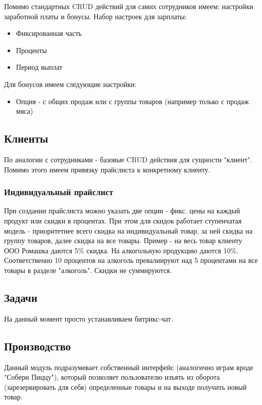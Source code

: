 \documentclass[DIV=calc, paper=a4, fontsize=11pt]{scrartcl} %
\begin{document}
Помимо стандартных CRUD действий для самих сотрудников имеем: настройки заработной платы и бонусы. Набор настроек для зарплаты:

\begin{itemize}
	\item Фиксированная часть
	\item Проценты
	\item Период выплат
\end{itemize}

Для бонусов имеем следующие настройки:

\begin{itemize}
	\item Опция - с общих продаж или с группы товаров (например только с продаж мяса)
\end{itemize}

\subsection{Клиенты}

По аналогии с сотрудниками - базовые CRUD действия для сущности "клиент". Помимо этого имеем привязку прайслиста к конкретному клиенту.

\subsubsection{Индивидуальный прайслист}
При создании прайслиста можно указать две опции - фикс. цены на каждый продукт или скидки в процентах. При этом для скидок работает ступенчатая модель - приоритетнее всего скидка на индивидуальный товар, за ней скидка на группу товаров, далее скидка на все товары.
Пример - на весь товар клиенту ООО Ромашка даются 5\% скидка. На алкогольную продукцию даются 10\%. Соответственно 10 процентов на алкоголь превалиируют над 5 процентами на все товары в разделе "алкоголь". Скидки не суммируются.

\subsection{Задачи}

На данный момент просто устанавливаем битрикс-чат.

\subsection{Производство}

Данный модуль подразумевает собственный интерфейс (аналогично играм вроде "Собери Пиццу"), который позволяет пользователю изъять из оборота (зарезервировать для себя) определенные товары и на выходе получить новый товар.
\end{document}

